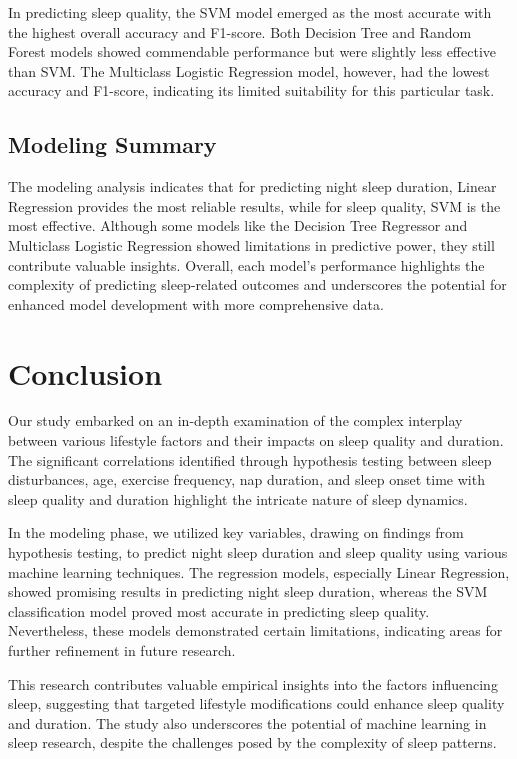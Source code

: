 \documentclass[conference]{IEEEtran}
\begin{document}
In predicting sleep quality, the SVM model emerged as the most accurate with the highest overall accuracy and F1-score. Both Decision Tree and Random Forest models showed commendable performance but were slightly less effective than SVM. The Multiclass Logistic Regression model, however, had the lowest accuracy and F1-score, indicating its limited suitability for this particular task.

\subsection*{Modeling Summary}
The modeling analysis indicates that for predicting night sleep duration, Linear Regression provides the most reliable results, while for sleep quality, SVM is the most effective. Although some models like the Decision Tree Regressor and Multiclass Logistic Regression showed limitations in predictive power, they still contribute valuable insights. Overall, each model's performance highlights the complexity of predicting sleep-related outcomes and underscores the potential for enhanced model development with more comprehensive data.

\section{Conclusion}

Our study embarked on an in-depth examination of the complex interplay between various lifestyle factors and their impacts on sleep quality and duration. The significant correlations identified through hypothesis testing between sleep disturbances, age, exercise frequency, nap duration, and sleep onset time with sleep quality and duration highlight the intricate nature of sleep dynamics.

In the modeling phase, we utilized key variables, drawing on findings from hypothesis testing, to predict night sleep duration and sleep quality using various machine learning techniques. The regression models, especially Linear Regression, showed promising results in predicting night sleep duration, whereas the SVM classification model proved most accurate in predicting sleep quality. Nevertheless, these models demonstrated certain limitations, indicating areas for further refinement in future research.

This research contributes valuable empirical insights into the factors influencing sleep, suggesting that targeted lifestyle modifications could enhance sleep quality and duration. The study also underscores the potential of machine learning in sleep research, despite the challenges posed by the complexity of sleep patterns.
\end{document}
